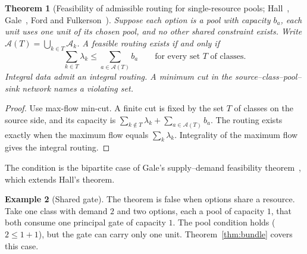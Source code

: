 \documentclass[11pt]{article}
\newtheorem{theorem}{Theorem}
\theoremstyle{definition}
\newtheorem{example}[theorem]{Example}
\theoremstyle{remark}
\begin{document}
\begin{theorem}[Feasibility of admissible routing for single-resource pools; Hall~\cite{hall},
Gale~\cite{gale57}, Ford and Fulkerson~\cite{fordfulkerson}]\label{thm:hall}
Suppose each option is a pool with capacity $b_a$, each unit uses one unit of its chosen pool, and no
other shared constraint exists. Write $\mathcal A(T)=\bigcup_{k\in T}\mathcal A_k$. A feasible routing
exists if and only if
\[
\sum_{k\in T}\lambda_k\le\sum_{a\in\mathcal A(T)}b_a\qquad\text{for every set }T\text{ of classes}.
\]
Integral data admit an integral routing. A minimum cut in the source--class--pool--sink network names
a violating set.
\end{theorem}
\begin{proof}
Use max-flow min-cut. A finite cut is fixed by the set $T$ of classes on the source side, and its
capacity is $\sum_{k\notin T}\lambda_k+\sum_{a\in\mathcal A(T)}b_a$. The routing exists exactly when
the maximum flow equals $\sum_k\lambda_k$. Integrality of the maximum flow gives the integral routing.
\end{proof}
The condition is the bipartite case of Gale's supply--demand feasibility theorem~\cite{gale57}, which
extends Hall's theorem.
\begin{example}[Shared gate]\label{ex:sharedgate}
The theorem is false when options share a resource. Take one class with demand $2$ and two options,
each a pool of capacity $1$, that both consume one principal gate of capacity $1$. The pool condition
holds ($2\le1+1$), but the gate can carry only one unit. Theorem~\ref{thm:bundle} covers this case.
\end{example}
\end{document}
